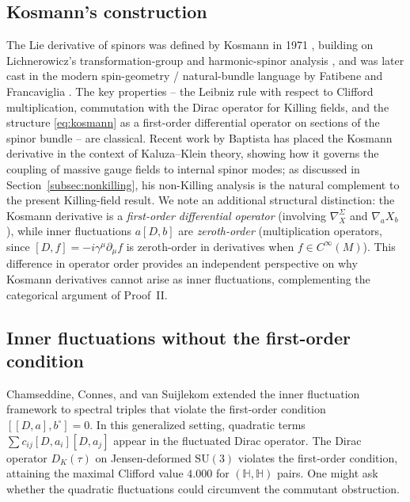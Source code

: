 \documentclass[12pt]{article}
\theoremstyle{definition}
\theoremstyle{remark}
\begin{document}
\subsection{Kosmann's construction}

The Lie derivative of spinors was defined by Kosmann in 1971 \cite{Kosmann1971}, building on Lichnerowicz's transformation-group and harmonic-spinor analysis \cite{Lichnerowicz1963}, and was later cast in the modern spin-geometry / natural-bundle language by Fatibene and Francaviglia \cite{Fatibene1996}.  The key properties -- the Leibniz rule with respect to Clifford multiplication, commutation with the Dirac operator for Killing fields, and the structure \eqref{eq:kosmann} as a first-order differential operator on sections of the spinor bundle -- are classical.  Recent work by Baptista \cite{Baptista2024KK, Baptista2025chiral} has placed the Kosmann derivative in the context of Kaluza--Klein theory, showing how it governs the coupling of massive gauge fields to internal spinor modes; as discussed in Section~\ref{subsec:nonkilling}, his non-Killing analysis is the natural complement to the present Killing-field result.  We note an additional structural distinction: the Kosmann derivative is a \emph{first-order differential operator} (involving $\nabla_X^\Sigma$ and $\nabla_a X_b$), while inner fluctuations $a[D,b]$ are \emph{zeroth-order} (multiplication operators, since $[D, f] = -i\gamma^\mu \partial_\mu f$ is zeroth-order in derivatives when $f \in C^\infty(M)$).  This difference in operator order provides an independent perspective on why Kosmann derivatives cannot arise as inner fluctuations, complementing the categorical argument of Proof~II.

\subsection{Inner fluctuations without the first-order condition}

Chamseddine, Connes, and van Suijlekom \cite{CCS2013inner} extended the inner fluctuation framework to spectral triples that violate the first-order condition $[[D, a], b^\circ] = 0$.  In this generalized setting, quadratic terms $\sum c_{ij} [D, a_i][D, a_j]$ appear in the fluctuated Dirac operator.  The Dirac operator $D_K(\tau)$ on Jensen-deformed $\mathrm{SU}(3)$ violates the first-order condition, attaining the maximal Clifford value $4.000$ for $(\mathbb{H}, \mathbb{H})$ pairs.  One might ask whether the quadratic fluctuations could circumvent the commutant obstruction.
\end{document}
